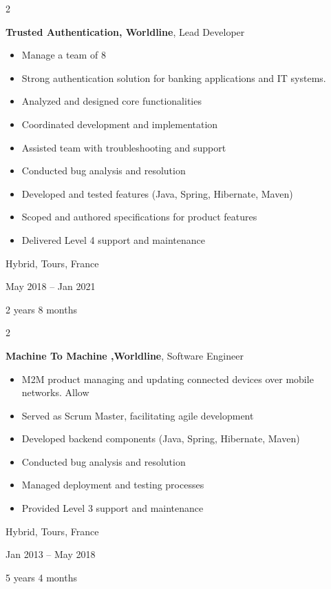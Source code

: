 \documentclass[10pt, letterpaper]{article}
\newenvironment{highlights}{
    \begin{itemize}[
        topsep=0.10 cm,
        parsep=0.10 cm,
        partopsep=0pt,
        itemsep=0pt,
        leftmargin=0.4 cm + 10pt
    ]
}{
    \end{itemize}
} %
\newenvironment{twocolentry}[2][]{
    \onecolentry
    \def\secondColumn{#2}
    \setcolumnwidth{\fill, 4.5 cm}
    \begin{paracol}{2}
}{
    \switchcolumn \raggedleft \secondColumn
    \end{paracol}
    \endonecolentry
} %
\begin{document}
        \vspace{0.2 cm}

        \begin{twocolentry}{
            Hybrid, Tours, France

        May 2018 – Jan 2021

        2 years 8 months
        }
            \textbf{Trusted Authentication, Worldline}, Lead Developer
            \begin{highlights}
                \item Manage a team of 8
                \item Strong authentication solution for banking applications and IT systems.
                \item Analyzed and designed core functionalities
                \item Coordinated development and implementation
                \item Assisted team with troubleshooting and support
                \item Conducted bug analysis and resolution
                \item Developed and tested features (Java, Spring, Hibernate, Maven)
                \item Scoped and authored specifications for product features
                \item Delivered Level 4 support and maintenance
            \end{highlights}
        \end{twocolentry}


        \vspace{0.2 cm}

        \begin{twocolentry}{
            Hybrid, Tours, France

        Jan 2013 – May 2018

        5 years 4 months
        }
            \textbf{Machine To Machine ,Worldline}, Software Engineer
            \begin{highlights}
                \item M2M product managing and updating connected devices over mobile networks. Allow
                \item Served as Scrum Master, facilitating agile development
                \item Developed backend components (Java, Spring, Hibernate, Maven)
                \item Conducted bug analysis and resolution
                \item Managed deployment and testing processes
                \item Provided Level 3 support and maintenance
            \end{highlights}
        \end{twocolentry}
\end{document}
